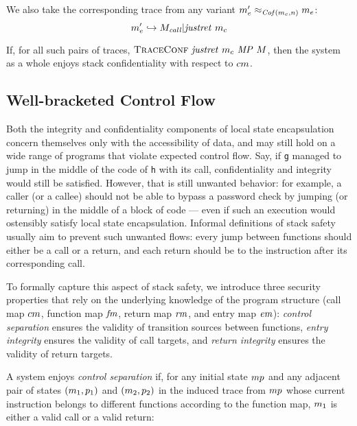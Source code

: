 \documentclass[acmsmall,review,anonymous]{acmart}\settopmatter{printfolios=true,printccs=false,printacmref=false}
\begin{document}
We also take the corresponding trace from any variant \(m_e'
\approx_{\mathit{Cof}(m_c,n)} m_e\):
%
\[m_e' \hookrightarrow M_{\mathit{call}} | \mathit{justret}\ m_c\]

If, for all such pairs of traces, \(\text{\sc TraceConf} ~
\mathit{justret}\ m_c ~ \mathit{MP} ~ M\), then the system as a whole enjoys
stack confidentiality with respect to \(cm\).


\subsection{Well-bracketed Control Flow}
\label{sec:wbcf}

Both the integrity and confidentiality components of local state
encapsulation concern themselves only with the accessibility of data, and
may still hold on a wide range of programs that violate expected control
flow. Say, if {\tt g} managed to jump in the middle of the
code of {\tt h} with its call, confidentiality and integrity would
still be satisfied.
%
However, that is still unwanted behavior: for example, a caller (or a
callee) should not be able to bypass a password check by jumping (or
returning) in the middle of a block of code --- even if such an execution
would ostensibly satisfy local state encapsulation.
%
Informal definitions of stack safety usually  aim to prevent such unwanted
flows: every jump between functions should either be a call or a
return, and each return should be to the instruction after its
corresponding call.

To formally capture this aspect of stack safety, we introduce three
security properties that rely on the underlying knowledge of the
program structure (call map $cm$, function map $\mathit{fm}$, return map $\mathit{rm}$, and entry
map $\mathit{em}$): {\em control separation} ensures the validity of transition
sources between functions, {\em entry integrity} ensures the validity
of call targets, and {\em return integrity} ensures the validity of
return targets.

A system enjoys {\em control separation}
if, for any initial state $mp$ and any adjacent pair
of states \((m_1,p_1)\) and \((m_2,p_2)\) in the induced
trace from $mp$ whose current instruction
belongs to different functions according to the function map,
$m_1$ is either a valid call or a valid return:
\end{document}
